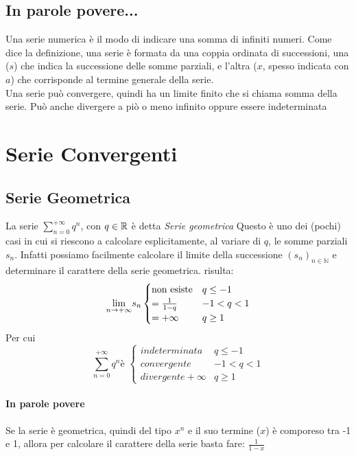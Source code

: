\documentclass[12pt, a4paper, openany]{book}
\begin{document}
\subsection*{In parole povere...}
Una serie numerica è il modo di indicare una somma di infiniti numeri.
Come dice la definizione, una serie è formata da una coppia ordinata di successioni, una ($s$) che indica la successione delle somme parziali, e l'altra ($x$, spesso indicata con $a$) che corrisponde al termine generale della serie.
\\Una serie può convergere, quindi ha un limite finito che si chiama somma della serie. Può anche divergere a piò o meno infinito oppure essere indeterminata
\section{Serie Convergenti}
\subsection{Serie Geometrica}
La serie $\sum_{n=0}^{+\infty} q^n$, con $q \in \mathbb{R}$ è detta \emph{Serie geometrica}
Questo è uno dei (pochi) casi in cui si riescono a calcolare esplicitamente, al variare di $q$, le somme parziali $s_n$.
Infatti possiamo facilmente calcolare il limite della successione $(s_n)_{n\in \mathbb{N}}$ e determinare il carattere della serie geometrica.
risulta:
\begin{equation}
	\underset{n \to +\infty}{\lim} s_n \begin{cases}
		\text{non esiste} & q \leq -1  \\
		= \frac{1}{1-q}   & -1 < q < 1 \\
		= +\infty         & q \geq 1
	\end{cases}
\end{equation}
Per cui
	\begin{equation}
		\sum_{n=0}^{+\infty} q^n \text{è } \begin{cases}
			indeterminata      & q \leq -1  \\
			convergente        & -1 < q < 1 \\
			divergente +\infty & q \geq 1
		\end{cases}
	\end{equation}


\paragraph{In parole povere}
Se la serie è geometrica, quindi del tipo $x^n$ e il suo termine ($x$) è comporeso tra -1 e 1, allora per calcolare il carattere della serie basta fare: $\frac{1}{1-x}$
\\
\end{document}
